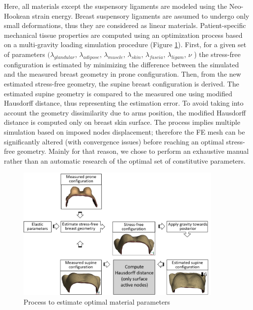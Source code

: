  Here, all materials except the suspensory ligaments are modeled using the Neo-Hookean strain energy. Breast suspensory ligaments are assumed to undergo only small deformations, thus they are considered as linear materials.  Patient-specific mechanical tissue properties are computed using an optimization process based on a multi-gravity loading simulation procedure (Figure \ref{fig:optimizationalgo}). First, for a given set of parameters $(\lambda_{glandular}$, $\lambda_{adipose}$, $ \lambda_{muscle}$,  $\lambda_{skin}$, $\lambda_{fascia}$, $\lambda_{ligam}$, $\nu$ ) the stress-free configuration is estimated by minimizing the difference between the simulated and the measured breast geometry in prone configuration. Then, from the new estimated stress-free geometry, the supine breast configuration is derived. The estimated supine geometry is compared to the measured one using modified Hausdorff distance, thus representing the estimation error.  To avoid taking into account the geometry dissimilarity due to arms position, the modified Hausdorff distance is computed only on breast skin surface.  
The process implies multiple simulation based on imposed nodes displacement; therefore the FE mesh can be significantly altered (with convergence issues) before reaching an optimal stress-free geometry. Mainly for that reason, we chose to perform an exhaustive manual rather than an automatic research of the optimal set of constitutive parameters. 


\begin{figure}[!h]
\centering
\includegraphics[width=0.9\textwidth,keepaspectratio]{figures/optimizationMaterialParameters.png} 
\caption{Process to estimate optimal material parameters}\label{fig:optimizationalgo}
\end{figure}
 
